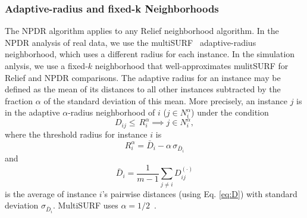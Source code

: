 \documentclass{bioinfo}
\begin{document}

\subsubsection{Adaptive-radius and fixed-k Neighborhoods}
The NPDR algorithm applies to any Relief neighborhood algorithm.
In the NPDR analysis of real data, we use the multiSURF~\citep{urbanowicz17} adaptive-radius neighborhood, which uses a different radius for each instance. In the simulation anlysis, we use a fixed-$k$ neighborhood that well-approximates mulitSURF for Relief and NPDR comparisons. %
The adaptive radius for an instance may be defined as the mean of its distances to all other instances subtracted by the fraction $\alpha$ of the standard deviation of this mean.
More precisely, an instance $j$ is in the adaptive $\alpha$-radius neighborhood of $i$ ($j \in N^{\alpha}_{i}$) under the condition
%
%
\begin{equation}
D_{ij} \le \, R_i^{\alpha} \implies j \in N^{\alpha}_{i},
\end{equation}
where the threshold radius for instance $i$ is
\begin{equation} 
R_i^{\alpha} =  \bar{D}_i - \alpha \, \sigma_{\bar{D}_i}
\end{equation}
and 
\begin{equation}
\bar{D}_i = \frac{1}{m-1} \sum_{j \ne i} D^{(\cdot)}_{ij}
\end{equation}
is the average of instance $i$'s pairwise distances (using Eq. \ref{eq:D}) with standard deviation $\sigma_{\bar{D}_i}$.
MultiSURF uses $\alpha=1/2$~\citep{msurf13}.
 
\end{document}

